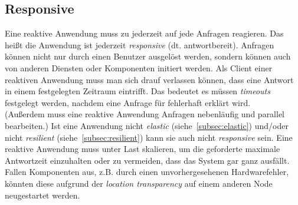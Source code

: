\subsection{Responsive}\label{subsec:responsive}
Eine reaktive Anwendung muss zu jederzeit auf jede Anfragen reagieren. Das heißt die Anwendung ist jederzeit \textit{responsive} (dt. antwortbereit). Anfragen können nicht nur durch einen Benutzer ausgelöst werden, sondern können auch von anderen Diensten oder Komponenten initiert werden. Als Client einer reaktiven Anwendung muss man sich drauf verlassen können, dass eine Antwort in einem festgelegten Zeitraum eintrifft. Das bedeutet es müssen \textit{timeouts} festgelegt werden, nachdem eine Anfrage für fehlerhaft erklärt wird.\\
(Außerdem muss eine reaktive Anwendung Anfragen nebenläufig und parallel bearbeiten.)
Ist eine Anwendung nicht \textit{elastic} (siehe~\ref{subsec:elastic}) und/oder nicht \textit{resilient} (siehe~\ref{subsec:resilient}) kann sie auch nicht \textit{responsive} sein. Eine reaktive Anwendung muss unter Last skalieren, um die geforderte maximale Antwortzeit einzuhalten oder zu vermeiden, dass das System gar ganz ausfällt. Fallen Komponenten aus, z.B. durch einen unvorhergesehenen Hardwarefehler, könnten diese aufgrund der \textit{location transparency} auf einem anderen Node neugestartet werden.

\pagebreak

